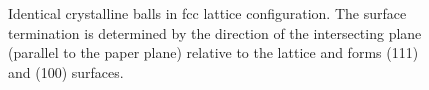
\begin{figure}\centering
	 \quad
	\caption{Identical crystalline balls in fcc lattice configuration. The surface termination is determined by the direction of the intersecting plane (parallel to the paper plane) relative to the lattice and forms (111) and (100) surfaces.}
	\label{fig:crystal-termination}
\end{figure}

